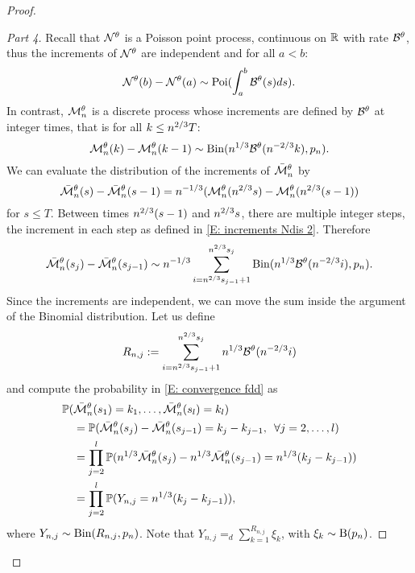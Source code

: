 \begin{proof}
\begin{proof}[Part 4]
Recall that $\mathcal{N}^{\theta}$ is a Poisson point process, continuous on $\mathbb{R}$ with rate $\mathcal{B}^{\theta}$,
thus the increments of $\mathcal{N}^{\theta}$ are independent and for all $a<b$: 
\begin{equation}
\mathcal{N}^{\theta}(b) - \mathcal{N}^{\theta}(a) \sim \operatorname*{Poi}( \int_{a}^{b} \mathcal{B}^{\theta}(s)ds).
\end{equation}
In contrast, $\mathcal{M}_n^{\theta}$ is a discrete process whose increments are defined by $\mathcal{B}^{\theta}$ at integer times, 
that is for all $k \leq n^{2 / 3}T$: 
\begin{equation} \label{E: increments Ndis 2}
\mathcal{M}_n^{\theta}(k) - \mathcal{M}_n^{\theta}(k-1) \sim \operatorname*{Bin}(n^{1 / 3}\mathcal{B}^{\theta}(n^{-2 / 3}k), p_n).
\end{equation}
We can evaluate the distribution of the increments of $\bar{\mathcal{M}}_n^{\theta}$ by
\begin{equation}
\bar{\mathcal{M}}_n^{\theta}(s) - \bar{\mathcal{M}}_n^{\theta}(s-1) = n^{-1 / 3}( \mathcal{M}_n^{\theta}(n^{2 / 3}s) - \mathcal{M}_n^{\theta}(n^{2 / 3}(s-1))
\end{equation}
for $s \leq T$.
Between times $n^{2 / 3}(s-1)$ and $n^{2 / 3}s$, there are multiple integer steps,
the increment in each step as defined in \eqref{E: increments Ndis 2}. 
Therefore
\begin{equation}
\bar{\mathcal{M}}_n^{\theta}(s_j) - \bar{\mathcal{M}}_n^{\theta}(s_{j-1}) \sim n^{-1 / 3} \sum_{i=n^{2 / 3}s_{j-1}+1}^{n^{2 / 3}s_j} \operatorname*{Bin}( n^{1 / 3}\mathcal{B}^{\theta}(n^{-2 / 3}i), p_n ).
\end{equation}
Since the increments are independent, we can move the sum inside the argument of the Binomial distribution.
Let us define 
\begin{equation*}
R_{n,j} := \sum_{i=n^{2 / 3}s_{j-1}+1}^{n^{2 / 3}s_j}n^{1 / 3}\mathcal{B}^{\theta}(n^{-2 / 3}i)
\end{equation*}
and compute the probability in \eqref{E: convergence fdd} as
\begin{equation} \label{E: distribution Ndis}
\begin{aligned}
&\mathbb{P}(\bar{\mathcal{M}}_n^{\theta}(s_1) = k_1, \dots, \bar{\mathcal{M}}_n^{\theta}(s_l) = k_l) \\
&\quad = \mathbb{P}( \bar{\mathcal{M}}_n^{\theta}(s_j) - \bar{\mathcal{M}}_n^{\theta}(s_{j-1}) = k_j - k_{j-1}, \enspace \forall j=2,\dots,l ) \\
&\quad = \prod_{j=2}^{l} \mathbb{P}( n^{1 / 3}\bar{\mathcal{M}}_n^{\theta}(s_j) - n^{1 / 3}\bar{\mathcal{M}}_n^{\theta}(s_{j-1}) = n^{1 / 3}(k_j - k_{j-1})) \\
&\quad = \prod_{j=2}^{l} \mathbb{P}( Y_{n,j} = n^{1 / 3}(k_j - k_{j-1}) ),
\end{aligned}
\end{equation}
where $Y_{n,j} \sim \operatorname*{Bin}(R_{n,j}, p_n)$.
Note that $Y_{n,j} =_d \sum_{k=1}^{R_{n,j}} \xi_k$, with $\xi_k \sim \operatorname*{B}(p_n)$.


\end{proof}
\end{proof}
